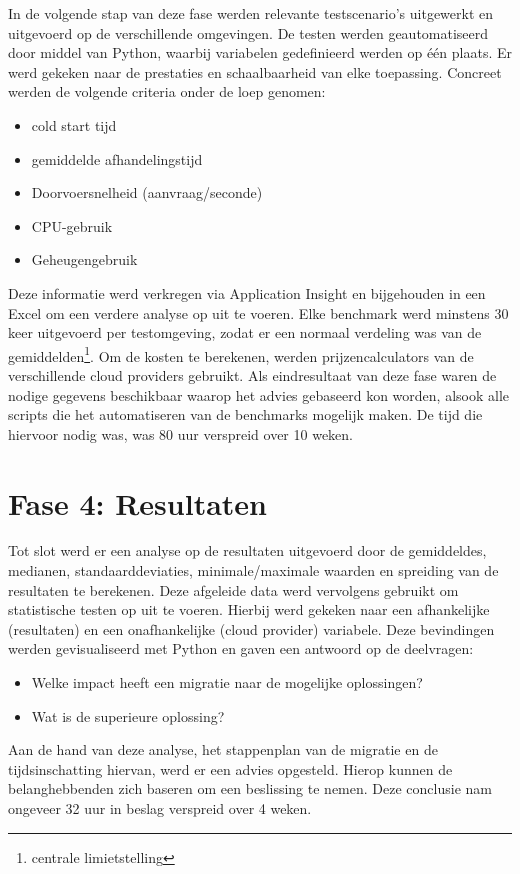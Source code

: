 In de volgende stap van deze fase werden relevante testscenario's uitgewerkt en uitgevoerd op de verschillende omgevingen. De testen werden geautomatiseerd door middel van Python, waarbij variabelen gedefinieerd werden op één plaats. Er werd gekeken naar de prestaties en schaalbaarheid van elke toepassing. Concreet werden de volgende criteria onder de loep genomen:

\begin{itemize}
    \item cold start tijd
    \item gemiddelde afhandelingstijd
    \item Doorvoersnelheid (aanvraag/seconde)
    \item CPU-gebruik
    \item Geheugengebruik
\end{itemize}

Deze informatie werd verkregen via Application Insight en bijgehouden in een Excel om een verdere analyse op uit te voeren. Elke benchmark werd minstens 30 keer uitgevoerd per testomgeving, zodat er een normaal verdeling was van de gemiddelden\footnote{centrale limietstelling}. Om de kosten te berekenen, werden prijzencalculators van de verschillende cloud providers gebruikt. Als eindresultaat van deze fase waren de nodige gegevens beschikbaar waarop het advies gebaseerd kon worden, alsook alle scripts die het automatiseren van de benchmarks mogelijk maken. De tijd die hiervoor nodig was, was 80 uur verspreid over 10 weken.

\section{Fase 4: Resultaten}

Tot slot werd er een analyse op de resultaten uitgevoerd door de gemiddeldes, medianen, standaarddeviaties, minimale/maximale waarden en spreiding van de resultaten te berekenen. Deze afgeleide data werd vervolgens gebruikt om statistische testen op uit te voeren. Hierbij werd gekeken naar een afhankelijke (resultaten) en een onafhankelijke (cloud provider) variabele. Deze bevindingen werden gevisualiseerd met Python en gaven een antwoord op de deelvragen: 

\begin{itemize}
    \item Welke impact heeft een migratie naar de mogelijke oplossingen?
    \item Wat is de superieure oplossing?
\end{itemize}

 Aan de hand van deze analyse, het stappenplan van de migratie en de tijdsinschatting hiervan, werd er een advies opgesteld. Hierop kunnen de belanghebbenden zich baseren om een beslissing te nemen. Deze conclusie nam ongeveer 32 uur in beslag verspreid over 4 weken. 